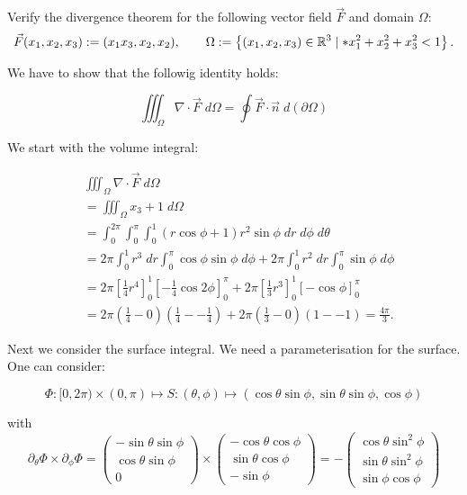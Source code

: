 \documentclass[11pt]{article}
\begin{document}
\begin{exercise}
    Verify the divergence theorem for the following vector field $\vec F$ and domain $\Omega$:
    \begin{gather*}
        \vec F(x_1,x_2,x_3) := ( x_1 x_3, x_2, x_2 ),
        \qquad 
        \Omega := \left\{ (x_1,x_2,x_3) \in \mathbb R^3 \suchthat* x_1^2 + x_2^2 + x_3^2 < 1 \right\}
        .
    \end{gather*}
\end{exercise}
\begin{solution}    
We have to show that the followig identity holds: 

$$
\iiint_{\Omega}\nabla \cdot \vec{F}\;d\Omega =  \oint \vec{F}\cdot \vec{n} \;d(\partial \Omega)
$$ 

We start with the volume integral:

    \begin{align*}
        &
        \iiint_{\Omega}\nabla \cdot \vec{F}\;d\Omega
        \\&
        =
        \iiint_{\Omega}x_3 + 1\;d\Omega
        \\&
        =
        \int_{0}^{2\pi}\int_0^{\pi}\int_0^ 1 (r\cos\phi + 1)r^ 2\sin\phi\;d r\;d\phi\;d\theta
        \\&
        =
        2\pi\int_0^1 r^3\;d r\int_0^{\pi}\cos\phi\sin\phi\;d \phi + 2\pi\int_0^1 r^2\;d r\int_0^{\pi}\sin\phi\;d \phi 
        \\&
        =
        2\pi\left[ \frac{1}{4}r^ 4 \right]_0^ {1} \left[-\frac{1}{4}\cos2\phi\right]_0^{\pi} + 2\pi\left[ \frac{1}{3}r^ 3 \right]_0^ {1} \left[-\cos\phi\right]_0^{\pi}
        \\&
        =
        2\pi\left(\frac{1}{4} - 0\right)\left(\frac{1}{4} - -\frac{1}{4}\right) + 2\pi\left(\frac{1}{3} - 0\right)\left(1 - - 1\right) = \frac{4\pi}{3}
        .
    \end{align*}

Next we consider the surface integral. We need a parameterisation for the surface. One can consider:

$$
\Phi: [0,2\pi) \times (0,\pi) \mapsto S: (\theta,\phi)\mapsto (\cos\theta \sin\phi, \sin\theta\sin\phi,\cos\phi)
$$

with 
$$
\partial_{\theta}\Phi\times \partial_{\phi}\Phi  = \begin{pmatrix} -\sin\theta\sin\phi\\ \cos\theta\sin\phi \\0 \end{pmatrix} \times \begin{pmatrix} -\cos\theta\cos\phi\\ \sin\theta\cos\phi \\-\sin\phi \end{pmatrix} = -\begin{pmatrix} \cos\theta\sin^2\phi\\ \sin\theta\sin^2\phi \\\sin\phi\cos\phi \end{pmatrix} 
$$


\end{solution}
\end{document}
